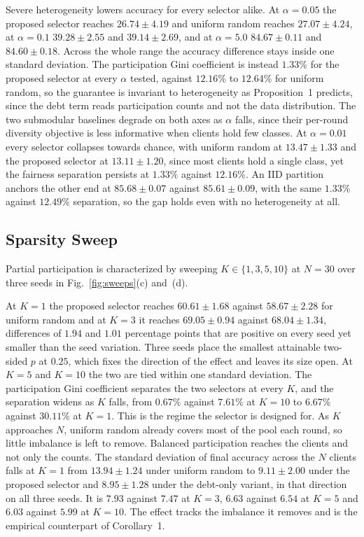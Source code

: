 \documentclass[journal]{IEEEtran}
\newcommand{\rev}[1]{{\color{blue}#1}}
\begin{document}
\rev{Severe heterogeneity lowers accuracy for every selector alike. At $\alpha = 0.05$ the proposed selector reaches $26.74 \pm 4.19$ and uniform random reaches $27.07 \pm 4.24$, at $\alpha = 0.1$ $39.28 \pm 2.55$ and $39.14 \pm 2.69$, and at $\alpha = 5.0$ $84.67 \pm 0.11$ and $84.60 \pm 0.18$. Across the whole range the accuracy difference stays inside one standard deviation. The participation Gini coefficient is instead $1.33\%$ for the proposed selector at every $\alpha$ tested, against $12.16\%$ to $12.64\%$ for uniform random, so the guarantee is invariant to heterogeneity as Proposition~1 predicts, since the debt term reads participation counts and not the data distribution. The two submodular baselines degrade on both axes as $\alpha$ falls, since their per-round diversity objective is less informative when clients hold few classes. At $\alpha = 0.01$ every selector collapses towards chance, with uniform random at $13.47 \pm 1.33$ and the proposed selector at $13.11 \pm 1.20$, since most clients hold a single class, yet the fairness separation persists at $1.33\%$ against $12.16\%$. An IID partition anchors the other end at $85.68 \pm 0.07$ against $85.61 \pm 0.09$, with the same $1.33\%$ against $12.49\%$ separation, so the gap holds even with no heterogeneity at all.}

\subsection{Sparsity Sweep}
\label{ssec:exp-sparsity}

\rev{Partial participation is characterized by sweeping $K \in \{1, 3, 5, 10\}$ at $N = 30$ over three seeds in Fig.~\ref{fig:sweeps}(c) and~(d).}



\rev{At $K = 1$ the proposed selector reaches $60.61 \pm 1.68$ against $58.67 \pm 2.28$ for uniform random and at $K = 3$ it reaches $69.05 \pm 0.94$ against $68.04 \pm 1.34$, differences of $1.94$ and $1.01$ percentage points that are positive on every seed yet smaller than the seed variation. Three seeds place the smallest attainable two-sided $p$ at $0.25$, which fixes the direction of the effect and leaves its size open. At $K = 5$ and $K = 10$ the two are tied within one standard deviation. The participation Gini coefficient separates the two selectors at every $K$, and the separation widens as $K$ falls, from $0.67\%$ against $7.61\%$ at $K = 10$ to $6.67\%$ against $30.11\%$ at $K = 1$. This is the regime the selector is designed for. As $K$ approaches $N$, uniform random already covers most of the pool each round, so little imbalance is left to remove.} \rev{Balanced participation reaches the clients and not only the counts. The standard deviation of final accuracy across the $N$ clients falls at $K = 1$ from $13.94 \pm 1.24$ under uniform random to $9.11 \pm 2.00$ under the proposed selector and $8.95 \pm 1.28$ under the debt-only variant, in that direction on all three seeds. It is $7.93$ against $7.47$ at $K = 3$, $6.63$ against $6.54$ at $K = 5$ and $6.03$ against $5.99$ at $K = 10$. The effect tracks the imbalance it removes and is the empirical counterpart of Corollary~1.}
\end{document}
